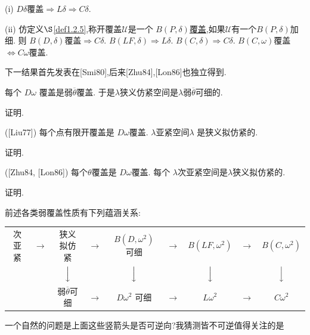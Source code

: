 \documentclass[main.tex]{subfiles}
\begin{document}
\begin{corollary}
	\textnormal{(i)}  $D\delta$覆盖$\Rightarrow L\delta \Rightarrow C\delta$.
	
	\textnormal{(ii)} 仿定义$\S$\ref{def1.2.5},称开覆盖$\mathscr{U}$是一个
	\underline{$B(P,\delta)$覆盖},如果$\mathscr{U}$有一个$B(P,\delta)$加细.
	则
	$B(D,\delta)$覆盖$\Rightarrow C\delta$. 
	$B(LF,\delta)\Rightarrow L\delta$. 
	$B(C,\delta)\Rightarrow C\delta$. 
	$B(C,\omega)$覆盖$\Leftrightarrow C\omega$覆盖. 
\end{corollary}

下一结果首先发表在[Smi80],后来[Zhu84],[Lon86]也独立得到.

\begin{theorem}
	每个 $D\omega$ 覆盖是弱$\overline{\theta}$覆盖.
	于是$\lambda$狭义仿紧空间是$\lambda$弱$\overline{\theta}$可细的.
\end{theorem}

证明.

\begin{theorem}
	\textnormal{([Liu77])} 每个点有限开覆盖是 $D\omega$覆盖. $\lambda$亚紧空间$\lambda$
	是狭义拟仿紧的.
\end{theorem}

证明.


\begin{theorem}
	\textnormal{([Zhu84, [Lon86])} 每个$\theta$覆盖是 $D\omega$覆盖. 每个 $\lambda$次亚紧空间是$\lambda$狭义拟仿紧的.
\end{theorem}

证明.

前述各类弱覆盖性质有下列蕴涵关系\textnormal{:}

\vspace{.3cm}
\begin{tabular}{ccccccccc}
次亚紧 & $\longrightarrow$ & 狭义拟仿紧&$\longrightarrow$&$B(D, \omega^2)$可细&
   $\longrightarrow$ & $B(LF, \omega^2)$ & $\longrightarrow$ & $B(C, \omega^2)$ \\
   & & $\Big\downarrow$ & & $\Big\downarrow$  & & $\Big\downarrow$ &&$\Big\downarrow$ \\
 & & 弱$\overline{\theta}$可细&$\longrightarrow$&$D\omega^2$ 可细&
$\longrightarrow$ & $L\omega^2$ & $\longrightarrow$ & $C\omega^2$ \\
 \end{tabular}

\vspace{.3cm}

一个自然的问题是上面这些竖箭头是否可逆向?我猜测皆不可逆值得关注的是
\end{document}
